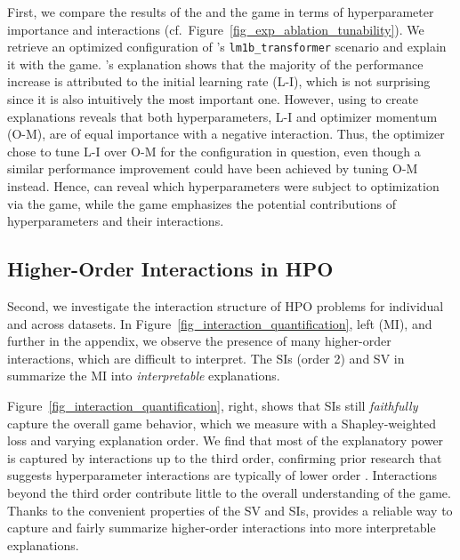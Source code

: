 \documentclass[letterpaper]{article} %
\newcommand{\myfigref}[1]{Figure~\ref{#1}}
\begin{document}
First, we compare the results of the \ablation and the \dstunability game in terms of hyperparameter importance and interactions (cf.~\myfigref{fig_exp_ablation_tunability}). We retrieve an optimized configuration of \pdone's \texttt{lm1b\_transformer} scenario and explain it with the \ablation game. \tool's explanation shows that the majority of the performance increase is attributed to the initial learning rate (L-I), which is not surprising since it is also intuitively the most important one. However, using \tool to create \dstunability explanations reveals that both hyperparameters, L-I and optimizer momentum (O-M), are of equal importance with a negative interaction. Thus, the optimizer chose to tune L-I over O-M for the configuration in question, even though a similar performance improvement could have been achieved by tuning O-M instead. Hence, \tool can reveal which hyperparameters were subject to optimization via the \ablation game, while the \dstunability game emphasizes the potential contributions of hyperparameters and their interactions.


\subsection{Higher-Order Interactions in HPO}\label{sec:exp-higher-order-interactions}\label{sex_exp_interaction_quantification}

Second, we investigate the interaction structure of HPO problems for individual and across datasets. 
In \myfigref{fig_interaction_quantification}, left (\gls*{MI}), and further in the appendix, %
we observe the presence of many higher-order interactions, which are difficult to interpret.
The \glspl*{SI} (order 2) and \gls*{SV} in \tool summarize the \gls*{MI} into \emph{interpretable} explanations.

\myfigref{fig_interaction_quantification}, right, shows that \glspl*{SI} still \emph{faithfully} capture the overall game behavior, which we measure with a Shapley-weighted loss \cite{Muschalik.2024} and varying explanation order. 
We find that most of the explanatory power is captured by interactions up to the third order, confirming prior research that suggests hyperparameter interactions are typically of lower order \cite{DBLP:conf/gecco/PushakH20a}. 
Interactions beyond the third order contribute little to the overall understanding of the game. 
Thanks to the convenient properties of the \gls*{SV} and \glspl*{SI}, \tool provides a reliable way to capture and fairly summarize higher-order interactions into more interpretable explanations.
\end{document}
